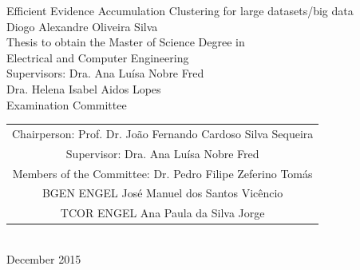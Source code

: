 \begin{center}
%
\vspace{2cm}
\vspace{3.0cm}
\vspace{1.0cm}
{\FontLb Efficient Evidence Accumulation Clustering for large datasets/big data} \\
\vspace{2.7cm}
{\FontMb Diogo Alexandre Oliveira Silva} \\
\vspace{2.0cm}
{\FontSn Thesis to obtain the Master of Science Degree in} \\
\vspace{0.3cm}
{\FontLb Electrical and Computer Engineering} \\
\vspace{1.1cm}
{\FontSn Supervisors: Dra. Ana Luísa Nobre Fred \\ Dra. Helena Isabel Aidos Lopes} \\
\vspace{1.1cm}
{\FontMb Examination Committee} \\
\vspace{0.3cm}
{\FontSn %
\begin{tabular}{c}
Chairperson: Prof. Dr. João Fernando Cardoso Silva Sequeira \\
Supervisor: Dra. Ana Luísa Nobre Fred \\
Members of the Committee: Dr. Pedro Filipe Zeferino Tomás \\
 BGEN ENGEL José Manuel dos Santos Vicêncio \\%
 TCOR ENGEL Ana Paula da Silva Jorge%
\end{tabular} } \\
\vspace{1.5cm}
{\FontMb December 2015} \\
%
\end{center}

\cleardoublepage

